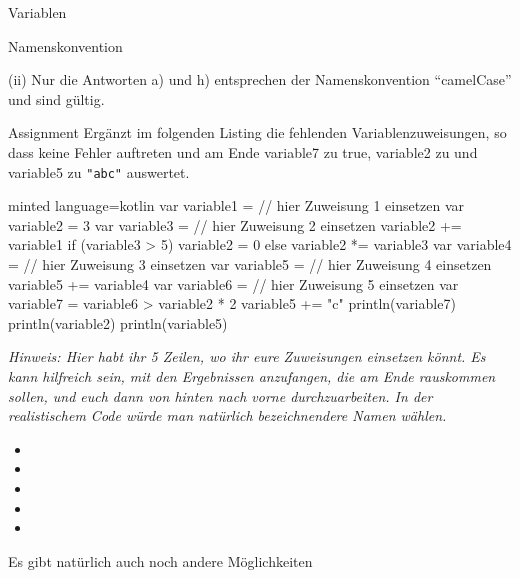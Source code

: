\begin{task}[points=auto]{Variablen }
\begin{subtask*}[points=0]{Namenskonvention}
\begin{solution}
            (ii) Nur die Antworten a) und h) entsprechen der Namenskonvention \enquote{camelCase} und sind gültig.
        \end{solution}
    \end{subtask*}
    \begin{subtask*}[points=0]{Assignment}
        Ergänzt im folgenden Listing die fehlenden Variablenzuweisungen, so dass keine Fehler auftreten und am Ende {\ttfamily variable7} zu {\ttfamily true}, {\ttfamily variable2} zu {} und {\ttfamily variable5} zu {\ttfamily \verb+"abc"+} auswertet.
        \begin{codeBlock}[]{minted language=kotlin}
            var variable1 = // hier Zuweisung 1 einsetzen
            var variable2 = 3
            var variable3 = // hier Zuweisung 2 einsetzen
            variable2 += variable1
            if (variable3 > 5) {
                    variable2 = 0
                } else {
                    variable2 *= variable3
                }
            var variable4 = // hier Zuweisung 3 einsetzen
            var variable5 = // hier Zuweisung 4 einsetzen
            variable5 += variable4
            var variable6 = // hier Zuweisung 5 einsetzen
            var variable7 = variable6 > variable2 * 2
            variable5 += "c"
            println(variable7)
            println(variable2)
            println(variable5)
        \end{codeBlock}

        \textit{Hinweis: Hier habt ihr 5 Zeilen, wo ihr eure Zuweisungen einsetzen könnt. Es kann hilfreich sein, mit den Ergebnissen anzufangen, die am Ende rauskommen sollen, und euch dann von hinten nach vorne durchzuarbeiten. In der realistischem Code würde man natürlich bezeichnendere Namen wählen.}

        \begin{solution}
            \begin{itemize}
                \item {}
                \item {}
                \item {}
                \item {}
                \item {}
            \end{itemize}
            Es gibt natürlich auch noch andere Möglichkeiten
        \end{solution}
    \end{subtask*}
\end{task}
